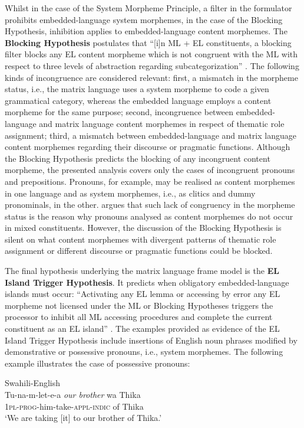 Whilst in the case of the System Morpheme Principle, a filter in the formulator prohibits embedded-language system morphemes, in the case of the Blocking Hypothesis, inhibition applies to embedded-language content morphemes. The \textbf{Blocking Hypothesis} postulates that ``[i]n ML + EL constituents, a blocking filter blocks any EL content morpheme which is not congruent with the ML with respect to three levels of abstraction regarding subcategorization'' \citep[120]{myers-scotton-duelling-1993}. The following kinds of incongruence are considered relevant: first, a mismatch in the morpheme status, i.e., the matrix language uses a system morpheme to code a given grammatical category, whereas the embedded language employs a content morpheme for the same purpose; second, incongruence between embedded-language and matrix language content morphemes in respect of thematic role assignment; third, a mismatch between embedded-language and matrix language content morphemes regarding their discourse or pragmatic functions. Although the Blocking Hypothesis predicts the blocking of any incongruent content morpheme, the presented analysis covers only the cases of incongruent pronouns and prepositions. Pronouns, for example, may be realised as content morphemes in one language and as system morphemes, i.e., as clitics and dummy pronominals, in the other. \citet[126--128]{myers-scotton-duelling-1993} argues that such lack of congruency in the morpheme status is the reason why pronouns analysed as content morphemes do not occur in mixed constituents. However, the discussion of the Blocking Hypothesis is silent on what content morphemes with divergent patterns of thematic role assignment or different discourse or pragmatic functions could be blocked.

The final hypothesis underlying the matrix language frame model is the \textbf{EL Island Trigger Hypothesis}. It predicts when obligatory embedded-language islands must occur:  ``Activating any EL lemma or accessing by error any EL morpheme not licensed under the ML or Blocking Hypotheses triggers the processor to inhibit all ML accessing procedures and complete the current constituent as an EL island'' \citep[139]{myers-scotton-duelling-1993}. The examples provided as evidence of the EL Island Trigger Hypothesis include insertions of English noun phrases modified by demonstrative or possessive pronouns, i.e., system morphemes. The following example illustrates the case of  possessive pronouns: 

\ea{\label{ex:1:10}}
Swahili-English \citep[141]{myers-scotton-duelling-1993}\\
\gll Tu-na-m-let-e-a \textit{our brother} wa Thika\\
	\textsc{1pl-prog}-him-take-\textsc{appl-indic} {}  of Thika\\
\glt `We are taking [it] to our brother of Thika.'
\z

